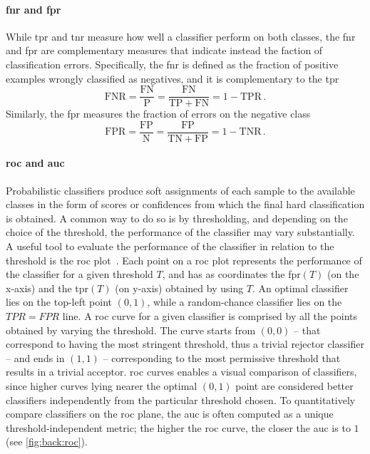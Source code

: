 \paragraph{\acrshort{fnr} and \acrshort{fpr}}
While \gls{tpr} and \gls{tnr} measure how well a classifier perform on both classes, the \gls{fnr} and \gls{fpr} are complementary measures that indicate instead the faction of classification errors.
Specifically, the \gls{fnr} is defined as the fraction of positive examples wrongly classified as negatives, and it is complementary to the \gls{tpr}
\begin{equation} \label{eq:back:fnr}
    \mathrm{FNR} = \frac{\mathrm{FN}}{\mathrm{P}} = \frac{\mathrm{FN}}{\mathrm{TP} + \mathrm{FN}} = 1 - \mathrm{TPR}\,.
\end{equation}
Similarly, the \gls{fpr} measures the fraction of errors on the negative class
\begin{equation} \label{eq:back:fpr}
    \mathrm{FPR} = \frac{\mathrm{FP}}{\mathrm{N}} = \frac{\mathrm{FP}}{\mathrm{TN} + \mathrm{FP}} = 1 - \mathrm{TNR}\,.
\end{equation}

\paragraph{\acrshort{roc} and \acrshort{auc}}
Probabilistic classifiers produce soft assignments of each sample to the available classes in the form of scores or confidences from which the final hard classification is obtained.
A common way to do so is by thresholding, and depending on the choice of the threshold, the performance of the classifier may vary substantially.
A useful tool to evaluate the performance of the classifier in relation to the threshold is the \gls{roc} plot~\cite{fawcett2006introduction}.
Each point on a \gls{roc} plot represents the performance of the classifier for a given threshold $T$, and has as coordinates the \gls{fpr}$(T)$ (on the x-axis) and the \gls{tpr}$(T)$ (on y-axis) obtained by using $T$.
An optimal classifier lies on the top-left point $(0,1)$, while a random-chance classifier lies on the $TPR = FPR$ line.
A \gls{roc} curve for a given classifier is comprised by all the points obtained by varying the threshold.
The curve starts from $(0,0)$ -- that correspond to having the most stringent threshold, thus a trivial rejector classifier -- and ends in $(1,1)$ -- corresponding to the most permissive threshold that results in a trivial acceptor.
\Gls{roc} curves enables a visual comparison of classifiers, since higher curves lying nearer the optimal $(0,1)$ point are considered better classifiers independently from the particular threshold chosen.
To quantitatively compare classifiers on the \gls{roc} plane, the \gls{auc} is often computed as a unique threshold-independent metric;
the higher the \gls{roc} curve, the closer the \gls{auc} is to $1$ (see \ref{fig:back:roc}).

